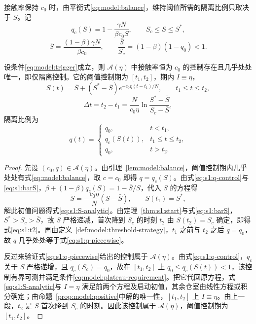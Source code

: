 接触率保持 $c_0$ 时，由平衡式\eqref{eq:model:balance}，维持阈值所需的隔离比例只取决于 $S$。记
\begin{equation}
q_c(S)=1-\frac{\gamma N}{\beta c_0S},\qquad S_c\le S\le S^*,
\label{eq:s1:q-control}
\end{equation}
\begin{equation}
\bar S=\frac{(1-\beta)\gamma N}{\beta c_0},\qquad
\frac{\bar S}{S_c}=(1-\beta)(1-q_0)<1.
\label{eq:s1:barS}
\end{equation}
\begin{theorem}
\label{thm:s1:qc-structure}\label{thm:s1:platform}
设条件\eqref{eq:model:trigger}成立，则 $\mathcal A(\eta)$ 中接触率恒为 $c_0$ 的控制存在且几乎处处唯一，即仅隔离控制。它的阈值控制期为 $[t_1,t_2]$，期内 $I\equiv\eta$，
\begin{equation}
S(t)=\bar S+(S^*-\bar S)e^{-c_0\eta(t-t_1)/N},\qquad t_1\le t\le t_2,
\label{eq:s1:S-analytic}
\end{equation}
\begin{equation}
\Delta t=t_2-t_1=\frac{N}{c_0\eta}\ln\frac{S^*-\bar S}{S_c-\bar S},
\label{eq:s1:t2}
\end{equation}
隔离比例为
\begin{equation}
q(t)=\begin{cases}
q_0,&t<t_1,\\
q_c(S(t)),&t_1\le t\le t_2,\\
q_0,&t>t_2.
\end{cases}
\label{eq:s1:q-piecewise}
\end{equation}
\end{theorem}
\begin{proof}
先设 $(c_0,q)\in\mathcal A(\eta)$。由引理~\ref{lem:model:balance}，阈值控制期内几乎处处有式\eqref{eq:model:balance}，取 $c=c_0$ 即得 $q=q_c(S)$。由式\eqref{eq:s1:q-control}与\eqref{eq:s1:barS}，$\beta+(1-\beta)q_c(S)=1-\bar S/S$，代入 $S$ 的方程得
\[
\dot S=-\frac{c_0\eta}{N}(S-\bar S),\qquad S(t_1)=S^*,
\]
解此初值问题得式\eqref{eq:s1:S-analytic}。由定理~\ref{thm:s1:start}与式\eqref{eq:s1:barS}，$S^*>S_c>\bar S$，故 $S$ 严格递减，首次降到 $S_c$ 的时刻 $t_2$ 由 $S(t_2)=S_c$ 确定，即得式\eqref{eq:s1:t2}。再由定义~\ref{def:model:threshold-strategy}，$t_1$ 之前与 $t_2$ 之后 $q=q_0$，故 $q$ 几乎处处等于式\eqref{eq:s1:q-piecewise}。

反过来验证式\eqref{eq:s1:q-piecewise}给出的控制属于 $\mathcal A(\eta)$。由式\eqref{eq:s1:q-control}，$q_c$ 关于 $S$ 严格递增，且 $q_c(S_c)=q_0$，故在 $[t_1,t_2]$ 上 $q_0\le q_c(S(t))<1$，该控制有界可测并满足条件\eqref{eq:model:plateau-requirement}。把它代回原方程，式\eqref{eq:s1:S-analytic}与 $I=\eta$ 满足前两个方程及启动初值，其余仓室由线性方程或积分确定；由命题~\ref{prop:model:positive}中解的唯一性，$[t_1,t_2]$ 上 $I\equiv\eta$。由上一段，$t_2$ 是 $S$ 首次降到 $S_c$ 的时刻。因此该控制属于 $\mathcal A(\eta)$，阈值控制期为 $[t_1,t_2]$。
\end{proof}

